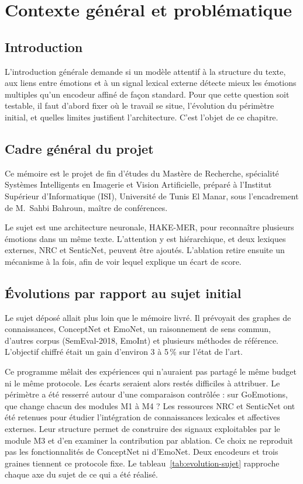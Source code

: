 \chapter{Contexte général et problématique}

\section*{Introduction}

L'introduction générale demande si un modèle attentif à la structure
du texte, aux liens entre émotions et à un signal lexical externe
détecte mieux les émotions multiples qu'un encodeur affiné de façon
standard. Pour que cette question soit testable, il faut d'abord fixer
où le travail se situe, l'évolution du périmètre initial, et quelles
limites justifient l'architecture. C'est l'objet de ce chapitre.

\section{Cadre général du projet}
\label{sec:cadre-general}

Ce mémoire est le projet de fin d'études du Mastère de Recherche,
spécialité Systèmes Intelligents en Imagerie et Vision Artificielle,
préparé à l'Institut Supérieur d'Informatique (ISI), Université de
Tunis El Manar, sous l'encadrement de M.~Sahbi Bahroun, maître de
conférences.

Le sujet est une architecture neuronale, HAKE-MER, pour reconnaître
plusieurs émotions dans un même texte. L'attention y est hiérarchique,
et deux lexiques externes, NRC et SenticNet, peuvent être ajoutés.
L'ablation retire ensuite un mécanisme à la fois, afin de voir lequel
explique un écart de score.

\section{Évolutions par rapport au sujet initial}
\label{sec:evolution-sujet}

Le sujet déposé allait plus loin que le mémoire livré. Il prévoyait
des graphes de connaissances, ConceptNet et EmoNet, un raisonnement de
sens commun, d'autres corpus (SemEval-2018, EmoInt) et plusieurs
méthodes de référence. L'objectif chiffré était un gain d'environ 3 à
5\,\% sur l'état de l'art.

Ce programme mêlait des expériences qui n'auraient pas partagé le même
budget ni le même protocole. Les écarts seraient alors restés difficiles
à attribuer. Le périmètre a été resserré autour d'une comparaison
contrôlée : sur GoEmotions, que change chacun des modules M1 à M4 ?
Les ressources NRC et SenticNet ont été retenues pour étudier
l'intégration de connaissances lexicales et affectives externes. Leur
structure permet de construire des signaux exploitables par le module
M3 et d'en examiner la contribution par ablation. Ce choix ne reproduit
pas les fonctionnalités de ConceptNet ni d'EmoNet. Deux encodeurs et
trois graines tiennent ce protocole fixe. Le tableau~\ref{tab:evolution-sujet} rapproche chaque axe du sujet
de ce qui a été réalisé.

